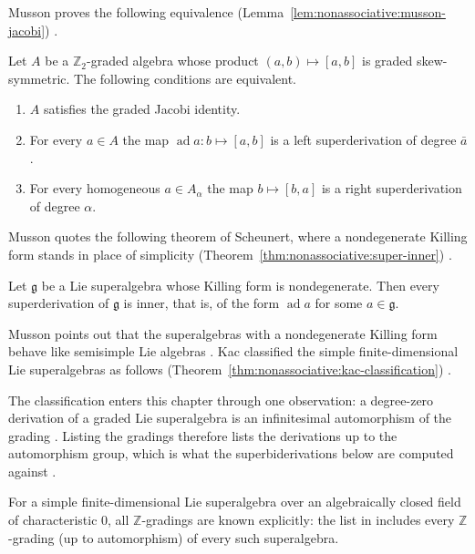 Musson proves the following equivalence (Lemma~\ref{lem:nonassociative:musson-jacobi}) \cite[Lemma~1.1.2,
pp.~2--3]{Musson2012}.\begin{lemma}
\label{lem:nonassociative:musson-jacobi}
Let $A$ be a $\mathbb{Z}_2$-graded algebra whose product
$(a,b)\mapsto [a,b]$ is graded skew-symmetric. The following conditions
are equivalent.
\begin{enumerate}
\item $A$ satisfies the graded Jacobi identity.
\item For every $a\in A$ the map $\operatorname{ad} a: b\mapsto [a,b]$
is a left superderivation of degree $\bar a$.
\item For every homogeneous $a\in A_{\alpha}$ the map
$b\mapsto [b,a]$ is a right superderivation of degree $\alpha$.
\end{enumerate}
\end{lemma}

Musson quotes the following theorem of Scheunert, where a nondegenerate
Killing form stands in place of simplicity (Theorem~\ref{thm:nonassociative:super-inner})
\cite[Theorem~2.6.2, pp.~19--20]{Musson2012}.\begin{theorem}
\label{thm:nonassociative:super-inner}
Let $\mathfrak{g}$ be a Lie superalgebra whose Killing form is
nondegenerate. Then every superderivation of $\mathfrak{g}$ is inner,
that is, of the form $\operatorname{ad} a$ for some $a\in\mathfrak{g}$.
\end{theorem}

Musson points out that the superalgebras with a nondegenerate Killing form
behave like semisimple Lie algebras \cite[p.~20]{Musson2012}. Kac classified
the simple finite-dimensional Lie superalgebras as follows
(Theorem~\ref{thm:nonassociative:kac-classification}) \cite[Theorem~1,
pp.~1385--1386]{Kac1977Classification}.

The classification enters this chapter through one observation: a degree-zero
derivation of a graded Lie superalgebra is an infinitesimal automorphism of
the grading \cite[Theorem~1, pp.~1385--1386]{Kac1977Classification}. Listing
the gradings therefore lists the derivations up to the automorphism group,
which is what the superbiderivations below are computed against
\cite[Theorem~1, pp.~1385--1386]{Kac1977Classification}.
\begin{theorem}
\label{thm:nonassociative:kac-classification} For a simple finite-dimensional
Lie superalgebra over an algebraically closed field of characteristic $0$, all
$\mathbb{Z}$-gradings are known explicitly: the list in
\cite{Kac1977Classification} includes every $\mathbb{Z}$-grading (up to
automorphism) of every such superalgebra. \end{theorem}

